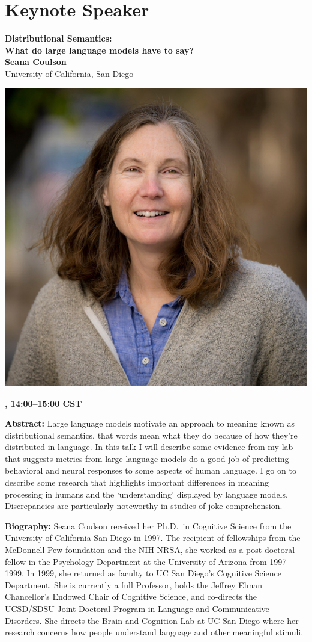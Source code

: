\newpage
\section{Keynote Speaker}

\begin{center}
{\bfseries\Large Distributional Semantics:\\\vspace{2.0\lineskip}What do large language models have to say?} \\
\vspace{1.0em}
{\large\bf Seana Coulson} \\
University of California, San Diego

\includegraphics[width=0.4\linewidth]{content/day3/seana-headshot.png}

\textbf{\daydateyear{}, 14:00--15:00 CST}\\
\textbf{\PlenaryLoc{}}
\end{center}

\noindent
{\bfseries Abstract:} 
Large language models motivate an approach to meaning known as distributional semantics, that words mean what they do because of how they're distributed in language. In this talk I will describe some evidence from my lab that suggests metrics from large language models do a good job of predicting behavioral and neural responses to some aspects of human language. I go on to describe some research that highlights important differences in meaning processing in humans and the `understanding' displayed by language models. Discrepancies are particularly noteworthy in studies of joke comprehension.

\vspace{1em}

{\bfseries Biography:} 
Seana Coulson received her Ph.D.~in Cognitive Science from the University of California San Diego in 1997. The recipient of fellowships from the McDonnell Pew foundation and the NIH NRSA, she worked as a post-doctoral fellow in the Psychology Department at the University of Arizona from 1997--1999. In 1999, she returned as faculty to UC San Diego's Cognitive Science Department. She is currently a full Professor, holds the Jeffrey Elman Chancellor's Endowed Chair of Cognitive Science, and co-directs the UCSD/SDSU Joint Doctoral Program in Language and Communicative Disorders. She directs the Brain and Cognition Lab at UC San Diego where her research concerns how people understand language and other meaningful stimuli.

\newpage
